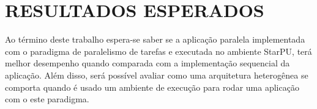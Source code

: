 
\chapter{RESULTADOS ESPERADOS}
\label{chap:resultados-esperados}

Ao término deste trabalho espera-se saber se a aplicação paralela implementada com o paradigma de paralelismo de tarefas e executada no ambiente StarPU, terá melhor desempenho quando comparada com a implementação sequencial da aplicação. Além disso, será possível avaliar como uma arquitetura heterogênea se comporta quando é usado um ambiente de execução para rodar uma aplicação com o este paradigma.